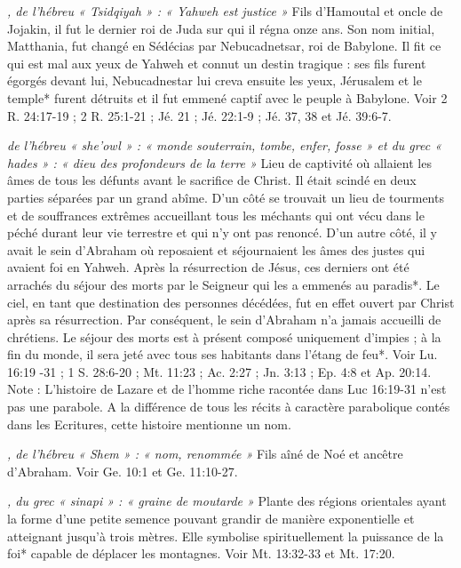 \begin{multicols}{2}
\textit{, de l'hébreu « Tsidqiyah » : « Yahweh est justice »}\newline
Fils d'Hamoutal et oncle de Jojakin, il fut le dernier roi de Juda sur qui il régna onze ans. Son nom initial, Matthania, fut changé en Sédécias par Nebucadnetsar, roi de Babylone. Il fit ce qui est mal aux yeux de Yahweh et connut un destin tragique : ses fils furent égorgés devant lui, Nebucadnestar lui creva ensuite les yeux, Jérusalem et le temple* furent détruits et il fut emmené captif avec le peuple à Babylone. Voir 2 R. 24:17-19 ; 2 R. 25:1-21 ; Jé. 21 ; Jé. 22:1-9 ; Jé. 37, 38 et Jé. 39:6-7.

\textit{de l'hébreu « she'owl » : « monde souterrain, tombe, enfer, fosse » et du grec « hades » : « dieu des profondeurs de la terre »}\newline
Lieu de captivité où allaient les âmes de tous les défunts avant le sacrifice de Christ. Il était scindé en deux parties séparées par un grand abîme. D'un côté se trouvait un lieu de tourments et de souffrances extrêmes accueillant tous les méchants qui ont vécu dans le péché durant leur vie terrestre et qui n'y ont pas renoncé. D'un autre côté, il y avait le sein d'Abraham où reposaient et séjournaient les âmes des justes qui avaient foi en Yahweh. Après la résurrection de Jésus, ces derniers ont été arrachés du séjour des morts par le Seigneur qui les a emmenés au paradis*. Le ciel, en tant que destination des personnes décédées, fut en effet ouvert par Christ après sa résurrection. Par conséquent, le sein d'Abraham n'a jamais accueilli de chrétiens. Le séjour des morts est à présent composé uniquement d'impies ; à la fin du monde, il sera jeté avec tous ses habitants dans l'étang de feu*. Voir Lu. 16:19 -31 ; 1 S. 28:6-20 ; Mt. 11:23 ; Ac. 2:27 ; Jn. 3:13 ; Ep. 4:8 et Ap. 20:14.
\\Note : L'histoire de Lazare et de l'homme riche racontée dans Luc 16:19-31 n'est pas une parabole. A la différence de tous les récits à caractère parabolique contés dans les Ecritures, cette histoire mentionne un nom.

\textit{, de l'hébreu « Shem » : « nom, renommée »}\newline
Fils aîné de Noé et ancêtre d'Abraham. Voir Ge. 10:1 et Ge. 11:10-27.

\textit{, du grec « sinapi » : « graine de moutarde »}\newline
Plante des régions orientales ayant la forme d'une petite semence pouvant grandir de manière exponentielle et atteignant jusqu'à trois mètres. Elle symbolise spirituellement la puissance de la foi* capable de déplacer les montagnes. Voir Mt. 13:32-33 et Mt. 17:20.


\end{multicols}
